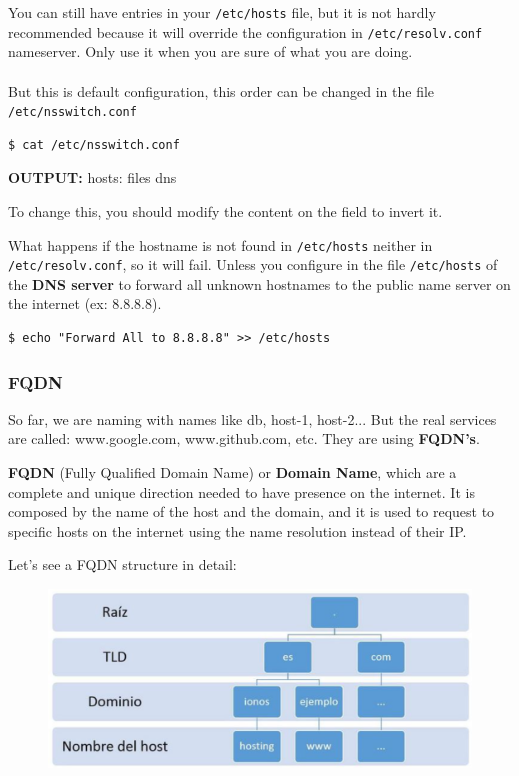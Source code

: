 \documentclass{article}
\newenvironment{blocktemplateIII}[1]{%
    \tcolorbox[beamer,%
    noparskip,breakable,
    ,colframe=Red,%
    colbacklower=LimeGreen!75!LightGreen,%
    title=#1]}%
    {\endtcolorbox}
\newenvironment{codetemplate}[1][]{%
  \mybasecolorbox[#1]
  \itshape
}{%
  \endmybasecolorbox
}
\begin{document}
\begin{blocktemplateIII}{WARNING}
You can still have entries in your \verb|/etc/hosts| file, but it is not hardly recommended because it will override the configuration in \verb|/etc/resolv.conf| nameserver. Only use it when you are sure of what you are doing.
\\\\
But this is default configuration, this order can be changed in the file \verb|/etc/nsswitch.conf|
\begin{codetemplate}{}
\begin{verbatim}
$ cat /etc/nsswitch.conf
\end{verbatim}
\end{codetemplate}

\textbf{OUTPUT:} hosts:    files dns

To change this, you should modify the content on the field to invert it.
\end{blocktemplateIII}

What happens if the hostname is not found in \verb|/etc/hosts| neither in \verb|/etc/resolv.conf|, so it will fail. Unless you configure in the file \verb|/etc/hosts| of the \textbf{DNS server} to forward all unknown hostnames to the public name server on the internet (ex: 8.8.8.8).

\begin{codetemplate}{}
\begin{verbatim}
$ echo "Forward All to 8.8.8.8" >> /etc/hosts
\end{verbatim}
\end{codetemplate}

\subsubsection{FQDN}

So far, we are naming with names like db, host-1, host-2... But the real services are called: www.google.com, www.github.com, etc. They are using \textbf{FQDN's}.

\textbf{FQDN} (Fully Qualified Domain Name) or \textbf{Domain Name}, which are a complete and unique direction needed to have presence on the internet. It is composed by the name of the host and the domain, and it is used to request to specific hosts on the internet using the name resolution instead of their IP.

Let's see a FQDN structure in detail:

\begin{figure}[H]
    \centering
    \includegraphics[scale=0.4]{pictures/image11.PNG}
\end{figure}
\end{document}
